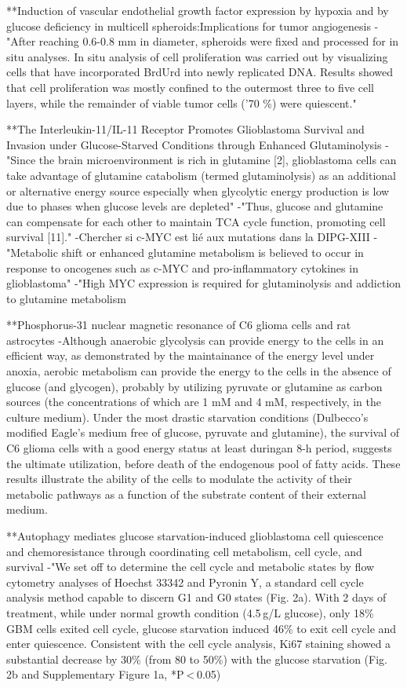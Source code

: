 \documentclass[11pt,a4paper]{article}
\begin{document}
**Induction of vascular endothelial growth factor expression by hypoxia and by glucose deficiency in multicell spheroids:Implications for tumor angiogenesis
-"After reaching 0.6-0.8 mm in diameter, spheroids were fixed and processed for in situ analyses. In situ analysis of cell proliferation was carried out by
visualizing cells that have incorporated BrdUrd into newly replicated DNA. Results showed that cell proliferation was mostly confined to the outermost three to five cell layers, while the remainder of viable tumor cells ('70 \%) were quiescent."

**The Interleukin-11/IL-11 Receptor Promotes Glioblastoma Survival and Invasion under Glucose-Starved Conditions through Enhanced Glutaminolysis
-"Since the brain microenvironment is rich in glutamine [2], glioblastoma cells can take advantage of glutamine catabolism (termed glutaminolysis) as an additional or alternative energy source especially when glycolytic energy production is low due to phases when glucose levels are depleted"
-"Thus, glucose and glutamine can compensate for each other to maintain TCA cycle function, promoting cell survival [11]."
-Chercher si c-MYC est lié aux mutations dans la DIPG-XIII
-"Metabolic shift or enhanced glutamine metabolism is believed to occur in response to oncogenes such as c-MYC and pro-inflammatory cytokines in glioblastoma"
-"High MYC expression is required for glutaminolysis and addiction to glutamine metabolism 

**Phosphorus-31 nuclear magnetic resonance of C6 glioma cells and rat astrocytes
-Although anaerobic glycolysis can provide energy to the cells in an efficient way, as demonstrated by the maintainance of the energy level under anoxia, aerobic metabolism
can provide the energy to the cells in the absence of glucose (and glycogen), probably by utilizing pyruvate or glutamine as carbon sources (the concentrations of which are 1 mM and 4 mM, respectively, in the culture medium). Under the most drastic starvation conditions (Dulbecco’s modified Eagle’s medium free of glucose, pyruvate and glutamine), the survival of C6 glioma cells with a good energy status at least duringan 8-h period, suggests the ultimate utilization, before death of the endogenous pool of fatty acids. These results illustrate the ability of the cells to modulate the activity of their metabolic pathways as a function of the substrate content of their
external medium.

**Autophagy mediates glucose starvation-induced glioblastoma cell quiescence and chemoresistance through coordinating cell metabolism, cell cycle, and survival
-"We set off to determine the cell cycle and metabolic states by flow cytometry analyses of Hoechst 33342 and Pyronin Y, a standard cell cycle analysis method capable to discern G1 and G0 states (Fig. 2a). With 2 days of treatment, while under normal growth condition (4.5 g/L glucose), only 18\% GBM cells exited cell cycle, glucose starvation induced 46\% to exit cell cycle and enter quiescence. Consistent with the cell cycle analysis, Ki67 staining showed a substantial decrease by 30\% (from 80 to 50\%) with the glucose starvation (Fig. 2b and Supplementary Figure 1a, *P < 0.05)
\end{document}
